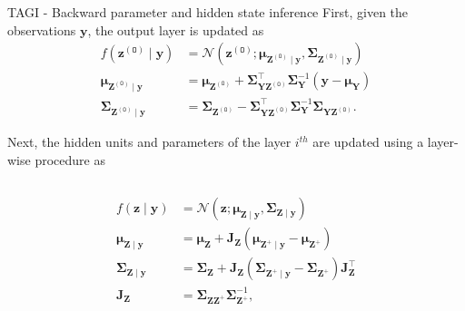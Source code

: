 \documentclass[final]{beamer}
\begin{document}
\begin{frame}[t]
\begin{columns}
\begin{column}[T]{.31\textwidth}
\begin{block}{TAGI - Backward parameter and hidden state inference}
First, given the observations $\bm{y}$, the output layer is updated as
\begin{equation*} \label{eq:z0update}
\begin{split}
f\left(\boldsymbol{z}^{(\mathtt{O})} \mid \boldsymbol{y}\right) &=\mathcal{N}\left(\boldsymbol{z}^{(\mathtt{O})} ; \boldsymbol{\mu}_{\boldsymbol{Z}^{(\mathtt{O})} \mid \boldsymbol{y}}, \boldsymbol{\Sigma}_{\boldsymbol{Z}^{(\mathtt{O})} \mid \boldsymbol{y}}\right) \\
\boldsymbol{\mu}_{\boldsymbol{Z}^{(\mathtt{O})} \mid \boldsymbol{y}} &=\boldsymbol{\mu}_{\boldsymbol{Z}^{(\mathtt{O})}}+\boldsymbol{\Sigma}_{\boldsymbol{Y} \boldsymbol{Z}^{(\mathtt{O})}}^{\top} \boldsymbol{\Sigma}_{\boldsymbol{Y}}^{-1}\left(\boldsymbol{y}-\boldsymbol{\mu}_{\boldsymbol{Y}}\right) \\
\boldsymbol{\Sigma}_{\boldsymbol{Z}^{(\mathtt{O})} \mid \boldsymbol{y}} &=\boldsymbol{\Sigma}_{\boldsymbol{Z}^{(\mathtt{O})}}-\boldsymbol{\Sigma}_{\boldsymbol{Y} \boldsymbol{Z}^{(\mathtt{O})}}^{\top} \boldsymbol{\Sigma}_{\boldsymbol{Y}}^{-1} \boldsymbol{\Sigma}_{\boldsymbol{Y Z}^{(\mathtt{O})}}.
\end{split}
\end{equation*}

Next, the hidden units and parameters of the layer $i^{th}$ are updated using a layer-wise procedure as
\begin{columns}
\begin{column}{0.5\textwidth}
\begin{equation*}  \label{eq:layerwiseupdate}
\begin{split}
f(\boldsymbol{z} \mid \boldsymbol{y}) &=\mathcal{N}\left(\boldsymbol{z} ; \boldsymbol{\mu}_{\boldsymbol{Z} \mid \boldsymbol{y}}, \boldsymbol{\Sigma}_{\boldsymbol{Z} \mid \boldsymbol{y}}\right) \\
\boldsymbol{\mu}_{\boldsymbol{Z} \mid \boldsymbol{y}} &=\boldsymbol{\mu}_{\boldsymbol{Z}}+\mathbf{J}_{\boldsymbol{Z}}\left(\boldsymbol{\mu}_{\boldsymbol{Z}^{+} \mid \boldsymbol{y}}-\boldsymbol{\mu}_{\boldsymbol{Z}^{+}}\right) \\
\boldsymbol{\Sigma}_{\boldsymbol{Z} \mid \boldsymbol{y}} &=\boldsymbol{\Sigma}_{\boldsymbol{Z}}+\mathbf{J}_{\boldsymbol{Z}}\left(\boldsymbol{\Sigma}_{\boldsymbol{Z}^{+} \mid \boldsymbol{y}}-\boldsymbol{\Sigma}_{\boldsymbol{Z}^{+}}\right) \mathbf{J}_{\boldsymbol{Z}}^{\top} \\
\mathbf{J}_{\boldsymbol{Z}} &=\boldsymbol{\Sigma}_{\boldsymbol{Z Z}^{+}} \boldsymbol{\Sigma}_{\boldsymbol{Z}^{+}}^{-1},
\end{split}
\end{equation*}
\end{column}


\end{columns}
\end{block}
\end{column}
\end{columns}
\end{frame}
\end{document}
